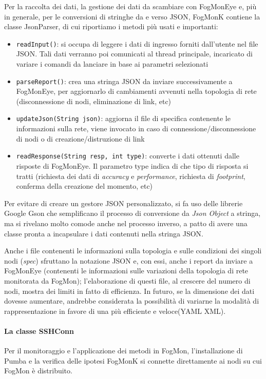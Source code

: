         Per la raccolta dei dati, la gestione dei dati da scambiare con FogMonEye e, più in generale, per le conversioni di stringhe da e verso JSON, FogMonK contiene la classe JsonParser, di cui riportiamo i metodi più usati e importanti:
        \begin{itemize}
            \item \texttt{readInput()}: si occupa di leggere i dati di ingresso forniti dall'utente nel file JSON. Tali dati verranno poi comunicati al thread principale, incaricato di variare i comandi da lanciare in base ai parametri selezionati
            \item \texttt{parseReport()}: crea una stringa JSON da inviare successivamente a FogMonEye, per aggiornarlo di cambiamenti avvenuti nella topologia di rete (disconnessione di nodi, eliminazione di link, etc)
            \item \texttt{updateJson(String json)}: aggiorna il file di specifica contenente le informazioni sulla rete, viene invocato in caso di connessione/disconnessione di nodi o di creazione/distruzione di link
            \item \texttt{readResponse(String resp, int type)}: converte i dati ottenuti dalle risposte di FogMonEye. Il parametro type indica di che tipo di risposta si tratti (richiesta dei dati di \textit{accuracy} e \textit{performance}, richiesta di \textit{footprint}, conferma della creazione del momento, etc)
        \end{itemize}
        Per evitare di creare un gestore JSON personalizzato, si fa uso delle librerie Google Gson \cite{gson} che semplificano il processo di conversione da \textit{Json Object} a stringa, ma si rivelano molto comode anche nel processo inverso, a patto di avere una classe pronta a incapsulare i dati contenuti nella stringa JSON.
        
        Anche i file contenenti le informazioni sulla topologia e sulle condizioni dei singoli nodi (\textit{spec}) sfruttano la notazione JSON e, con essi, anche i report da inviare a FogMonEye (contenenti le informazioni sulle variazioni della topologia di rete monitorata da FogMon); l’elaborazione di questi file, al crescere del numero di nodi, mostra dei limiti in fatto di efficienza. In futuro, se la dimensione dei dati dovesse aumentare, andrebbe considerata la possibilità di variarne la modalità di rappresentazione in favore di una più efficiente e veloce(YAML XML).
        \paragraph{La classe SSHConn}\mbox{}\newline
        Per il monitoraggio e l'applicazione dei metodi in FogMon, l'installazione di Pumba e la verifica delle ipotesi FogMonK si connette direttamente ai nodi su cui FogMon è distribuito.
        
